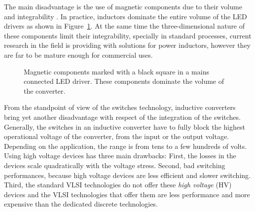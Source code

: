 The main disadvantage is the use of magnetic components due to their volume and integrability . In practice, inductors dominate the entire volume of the LED drivers as shown in Figure~\ref{fig:smps_driver}. At the same time the three-dimensional nature of these components limit their integrability, specially in standard processes, current research in the field is providing with solutions for power inductors, however they are far to be mature enough for commercial uses.

\begin{figure}
\centering
{}
\caption{Magnetic components marked with a black square in a mains connected LED driver. These components dominate the volume of the converter.}
\label{fig:smps_driver}
\end{figure}

From the standpoint of view of the switches technology, inductive converters bring yet another disadvantage with respect of the integration of the switches.  Generally, the switches in an inductive converter have to fully block the highest operational voltage of the converter, from the input or the output voltage. Depending on the application, the range is from tens to a few hundreds of volts. Using high voltage devices has three main drawbacks: First, the losses in the devices scale quadratically with the voltage  stress. Second, bad switching performances, because high voltage devices are less efficient and slower switching. Third, the standard VLSI technologies do not offer these \emph{high voltage} (HV) devices and the VLSI technologies that offer them are less performance and more expensive than the dedicated discrete technologies.

